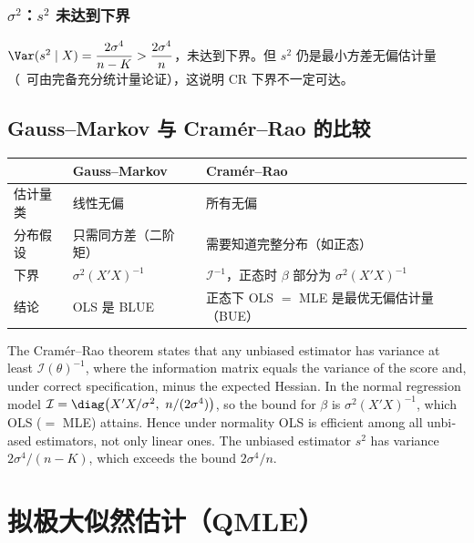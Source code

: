 \subsubsection{\texorpdfstring{$\sigma^2$}{sigma\^{}2}：\texorpdfstring{$s^2$}{s\^{}2} 未达到下界}

$\Var(s^2\mid X)=\dfrac{2\sigma^4}{n-K}>\dfrac{2\sigma^4}{n}$，未达到下界。但 $s^2$ 仍是最小方差无偏估计量（\tagext\ 可由完备充分统计量论证），这说明 CR 下界不一定可达。

\subsection{Gauss--Markov 与 Cramér--Rao 的比较}

\begin{center}
\small
\begin{tabularx}{\linewidth}{lLL}
\toprule
 & Gauss--Markov & Cramér--Rao\\
\midrule
估计量类 & 线性无偏 & 所有无偏\\
分布假设 & 只需同方差（二阶矩） & 需要知道完整分布（如正态）\\
下界 & $\sigma^2(X'X)^{-1}$ & $\mathcal I^{-1}$，正态时 $\beta$ 部分为 $\sigma^2(X'X)^{-1}$\\
结论 & OLS 是 BLUE & 正态下 OLS $=$ MLE 是最优无偏估计量（BUE）\\
\bottomrule
\end{tabularx}
\end{center}

\begin{english}
The Cramér--Rao theorem states that any unbiased estimator has variance at least $\mathcal I(\theta)^{-1}$, where the information matrix equals the variance of the score and, under correct specification, minus the expected Hessian. In the normal regression model $\mathcal I=\diag\big(X'X/\sigma^2,\ n/(2\sigma^4)\big)$, so the bound for $\beta$ is $\sigma^2(X'X)^{-1}$, which OLS ($=$ MLE) attains. Hence under normality OLS is efficient among all unbiased estimators, not only linear ones. The unbiased estimator $s^2$ has variance $2\sigma^4/(n-K)$, which exceeds the bound $2\sigma^4/n$.
\end{english}

\section{拟极大似然估计（QMLE）}\label{sec:U04-qmle}

